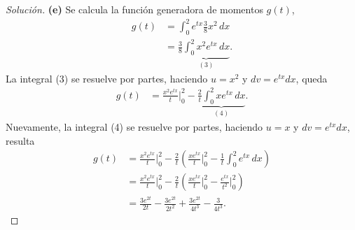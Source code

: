 \documentclass[12pt,letterpaper]{article}
\newcommand\integral[4]{\ensuremath{\int_{#1}^{#2} #3 \, d#4}}
\begin{document}
\begin{proof}[Solución]
\textbf{(e)} Se calcula la función generadora de momentos $g(t)$,
\begin{align}
g(t) &= \integral{0}{2}{e^{tx} \frac{3}{8} x^2}{x} \\ 
&= \frac{3}{8} \underbrace{\integral{0}{2}{x^2 e^{tx}}{x}}_{(3)}.
\end{align}
La integral (3) se resuelve por partes, haciendo $u=x^2$ y $dv=e^{tx}dx$, queda
\begin{align}
g(t) &= \frac{x^2e^{tx}}{t} \Big\lvert^{2}_{0} - \underbrace{\frac{2}{t} \integral{0}{2}{xe^{tx}}{x}}_{(4)}.
\end{align}
Nuevamente, la integral (4) se resuelve por partes, haciendo $u=x$ y $dv=e^{tx}dx$, resulta
\begin{align}
g(t) &= \frac{x^2e^{tx}}{t} \Big\lvert^{2}_{0} - \frac{2}{t}\left(\frac{xe^{tx}}{t} \Big\lvert^{2}_{0}- \frac{1}{t} \integral{0}{2}{e^{tx}}{x}\right) \\
&= \frac{x^2e^{tx}}{t} \Big\lvert^{2}_{0} - \frac{2}{t}\left(\frac{xe^{tx}}{t} \Big\lvert^{2}_{0}- \frac{e^{tx}}{t^2} \Big\lvert^{2}_{0}  \right) \\
&= \frac{3e^{2t}}{2t} - \frac{3e^{2t}}{2t^2} + \frac{3e^{2t}}{4t^3} - \frac{3}{4t^3}.
\end{align}
\end{proof}
\end{document}
